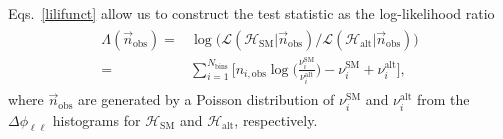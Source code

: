 \documentclass[preprint]{JHEP3} %
\newcommand{\mrm}{\mathrm}
\newcommand{\SM}{\mathrm{SM}}
\newcommand{\alt}{\mathrm{alt}}
\def\HSM{\mathcal{H}_{\mathrm{SM}}}
\def\Halt{\mathcal{H}_{\mathrm{alt}}}
\newcommand{\be}{\begin{eqnarray}}
\newcommand{\ee}{\end{eqnarray}}
\begin{document}
Eqs.~\ref{lilifunct} allow us to construct the test statistic as the log-likelihood ratio
\be
\begin{split}
  \Lambda(\vec{n}_\mathrm{obs}) =& \log \biggl( \mathcal{L}(\HSM |\vec{n}_\mathrm{obs})  \big/ \mathcal{L}(\Halt|\vec{n}_\mathrm{obs})  \biggr)  \\
                                =& \sum_{i=1}^{N_\mathrm{bins}} \biggl[ n_{i,\mathrm{obs}}\log \biggl( \frac{\nu_i^{\SM}}{\nu_i^{\alt}} \biggr) -\nu_i^{\SM} + \nu_i^{\alt} \biggr],
\end{split}
\ee
where $\vec{n}_{\mrm{obs}}$ are generated by a Poisson distribution of $\nu_i^{\SM}$ and $\nu_i^{\alt}$
from the $\Delta \phi_{\ell\ell}$ histograms for $\HSM$ and $\Halt$, respectively.
\end{document}
